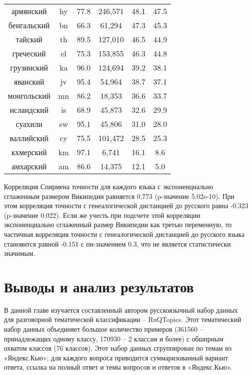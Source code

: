 \begin{table*}[!htbp]
\begin{minipage}{0.5\textwidth}
{\begin{tabular}[baseline={(0,2.1)}]{|c|c|c|c|c|c|}
армянский & hy & 77.8 & 246,571 & 48.1 & 47.5\\
бенгальский & bn & 66.3 & 61,294 & 47.3 & 45.3\\
тайский & th & 89.5 & 127,010 & 46.5 & 44.9\\
греческий & el & 75.3 & 153,855 & 46.3 & 44.8\\
грузинский & ka & 96.0 & 124,694 & 39.2 & 38.1\\
яванский & jv & 95.4 & 54,964 & 38.7 & 37.1\\
монгольский & mn & 86.2 & 18,353 & 36.6 & 33.7\\
исландский & is & 68.9 & 45,873 & 32.6 & 29.9\\
суахили & sw & 95.1 & 45,806 & 31.0 & 28.0\\
валлийский & cy & 75.5 & 101,472 & 28.5 & 25.3\\
кхмерский & km & 97.1 & 6,741 & 16.1 & 8.6\\
амхарский & am & 86.6 & 14,375 & 12.1 & 5.0\\ \hline
\hline
\end{tabular}
}
\end{minipage}
\end{table*}

Корреляция Спирмена точности для каждого языка с экспоненциально сглаженным размером Википедии равняется 0.773 (p-значение 5.02e-10). При этом корреляция точности с генеалогической дистанцией до русского равна -0.323 (p-значение 0.022). Если же учесть при подсчете этой корреляции экспоненциально сглаженный размер Википедии как третью переменную, то частичная корреляция точности с генеалогической дистанцией до русского языка становится равной -0.151 с пи-значением 0.3, что не является статистически значимым.


\section{Выводы и анализ результатов} 

В данной главе изучается составленный автором русскоязычный набор данных для разговорной тематической классификации -- {RuQTopics}. Этот тематический набор данных объединяет большое количество примеров (361560 -- принадлежащих одному классу, 170930 -- 2 классам и более) с обширным охватом классов (76 классов). Этот набор данных сгруппирован по темам из «Яндекс.Кью»; для каждого вопроса приводится суммаризованный вариант ответа, ссылка на полный ответ и темы вопросов и ответов в «Яндекс.Кью».

